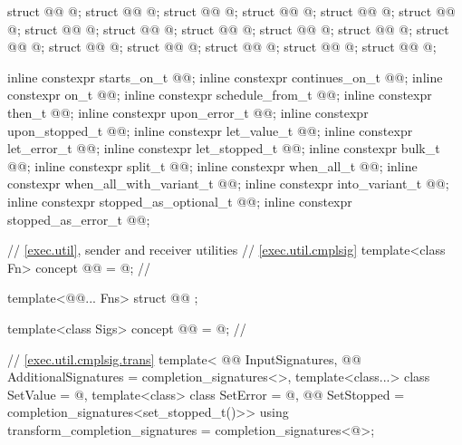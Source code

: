 \begin{codeblock}
{  struct @@ { @\unspec@ };
  struct @@ { @\unspec@ };
  struct @@ { @\unspec@ };
  struct @@ { @\unspec@ };
  struct @@ { @\unspec@ };
  struct @@ { @\unspec@ };
  struct @@ { @\unspec@ };
  struct @@ { @\unspec@ };
  struct @@ { @\unspec@ };
  struct @@ { @\unspec@ };
  struct @@ { @\unspec@ };
  struct @@ { @\unspec@ };
  struct @@ { @\unspec@ };
  struct @@ { @\unspec@ };
  struct @@ { @\unspec@ };
  struct @@ { @\unspec@ };
  struct @@ { @\unspec@ };

  inline constexpr starts_on_t @@{};
  inline constexpr continues_on_t @@{};
  inline constexpr on_t @@{};
  inline constexpr schedule_from_t @@{};
  inline constexpr then_t @@{};
  inline constexpr upon_error_t @@{};
  inline constexpr upon_stopped_t @@{};
  inline constexpr let_value_t @@{};
  inline constexpr let_error_t @@{};
  inline constexpr let_stopped_t @@{};
  inline constexpr bulk_t @@{};
  inline constexpr split_t @@{};
  inline constexpr when_all_t @@{};
  inline constexpr when_all_with_variant_t @@{};
  inline constexpr into_variant_t @@{};
  inline constexpr stopped_as_optional_t @@{};
  inline constexpr stopped_as_error_t @@{};

  // \ref{exec.util}, sender and receiver utilities
  // \ref{exec.util.cmplsig}
  template<class Fn>
    concept @@ = @\seebelownc@;                   // \expos

  template<@@... Fns>
    struct @@ {};

  template<class Sigs>
    concept @@ = @\seebelownc@;            // \expos

  // \ref{exec.util.cmplsig.trans}
  template<
    @@ InputSignatures,
    @@ AdditionalSignatures = completion_signatures<>,
    template<class...> class SetValue = @\seebelow@,
    template<class> class SetError = @\seebelow@,
    @@ SetStopped = completion_signatures<set_stopped_t()>>
  using transform_completion_signatures = completion_signatures<@\seebelow@>;

}
\end{codeblock}
